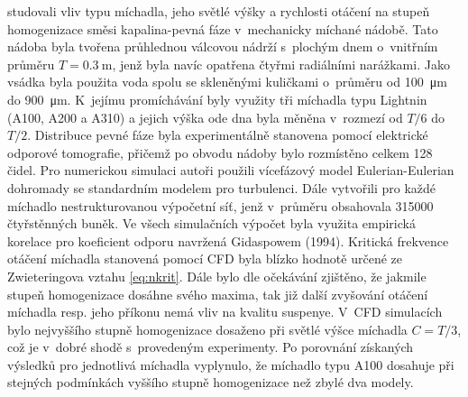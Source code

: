 \citet{hos10} studovali vliv typu míchadla, jeho světlé výšky a rychlosti otáčení na stupeň homogenizace směsi kapalina-pevná fáze v~mechanicky míchané nádobě. Tato nádoba byla tvořena průhlednou válcovou nádrží s~plochým dnem o~vnitřním průměru $T=\SI{0.3}{\meter}$, jenž byla navíc opatřena čtyřmi radiálními narážkami. Jako vsádka byla použita voda spolu se skleněnými kuličkami o~průměru od \SI{100}{\micro\meter} do \SI{900}{\micro\meter}. K~jejímu promíchávání byly využity tři míchadla typu Lightnin (A100, A200 a A310) a jejich výška ode dna byla měněna v~rozmezí od $T/6$ do $T/2$. Distribuce pevné fáze byla experimentálně stanovena pomocí elektrické odporové tomografie, přičemž po obvodu nádoby bylo rozmístěno celkem \num{128} čidel. Pro numerickou simulaci autoři použili vícefázový model Eulerian-Eulerian dohromady se standardním \keps{} modelem pro turbulenci. Dále vytvořili pro každé míchadlo nestrukturovanou výpočetní síť, jenž v~průměru obsahovala \num{315000} čtyřstěnných buněk. Ve všech simulačních výpočet byla využita empirická korelace pro koeficient odporu navržená Gidaspowem (1994). Kritická frekvence otáčení míchadla stanovená pomocí CFD byla blízko hodnotě určené ze Zwieteringova vztahu \ref{eq:nkrit}. Dále bylo dle očekávání  zjištěno, že jakmile stupeň homogenizace dosáhne svého maxima, tak již další zvyšování otáčení míchadla resp. jeho příkonu nemá vliv na kvalitu suspenye. V~CFD simulacích bylo nejvyššího stupně homogenizace dosaženo při světlé výšce míchadla $C=T/3$, což je v~dobré shodě s~provedeným experimenty. Po porovnání získaných výsledků pro jednotlivá míchadla vyplynulo, že míchadlo typu A100 dosahuje při stejných podmínkách vyššího stupně homogenizace než zbylé dva modely.


